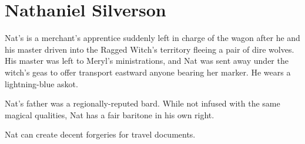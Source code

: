\section{Nathaniel Silverson}

Nat's is a merchant's apprentice suddenly left in charge of the wagon after he and his master
  driven into the Ragged Witch's territory fleeing a pair of dire wolves.
His master was left to Meryl's ministrations, and Nat was sent away under the witch's geas to
  offer transport eastward anyone bearing her marker.
He wears a lightning-blue askot.

Nat's father was a regionally-reputed bard.
While not infused with the same magical qualities, Nat has a fair baritone in his own right.

Nat can create decent forgeries for travel documents.
